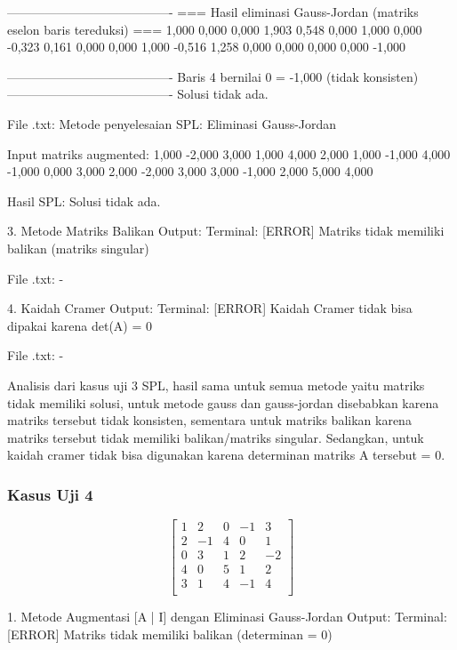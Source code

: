 \documentclass[12pt]{article}
\begin{document}
\begin{enumerate}
\begin{keluaran}
----------------------------------------
=== Hasil eliminasi Gauss-Jordan (matriks eselon baris tereduksi) ===
1,000   0,000   0,000   1,903   0,548
0,000   1,000   0,000   -0,323  0,161
0,000   0,000   1,000   -0,516  1,258
0,000   0,000   0,000   0,000   -1,000

----------------------------------------
Baris 4 bernilai 0 = -1,000 (tidak konsisten)
----------------------------------------
Solusi tidak ada.

File .txt:
Metode penyelesaian SPL: Eliminasi Gauss-Jordan

Input matriks augmented:
1,000	-2,000	3,000	1,000	4,000
2,000	1,000	-1,000	4,000	-1,000
0,000	3,000	2,000	-2,000	3,000
3,000	-1,000	2,000	5,000	4,000

Hasil SPL:
Solusi tidak ada.

3. Metode Matriks Balikan
Output:
Terminal:
[ERROR] Matriks tidak memiliki balikan (matriks singular)

File .txt:
-

4. Kaidah Cramer
Output:
Terminal:
[ERROR] Kaidah Cramer tidak bisa dipakai karena det(A) = 0

File .txt:
-
\end{keluaran}
Analisis dari kasus uji 3 SPL, hasil sama untuk semua metode yaitu matriks tidak memiliki solusi, untuk metode gauss dan gauss-jordan disebabkan karena matriks tersebut tidak konsisten, sementara untuk matriks balikan karena matriks tersebut tidak memiliki balikan/matriks singular. Sedangkan, untuk kaidah cramer tidak bisa digunakan karena determinan matriks A tersebut = 0.
\subsubsection{Kasus Uji 4}
\begin{equation}
    \begin{bmatrix}
        1 & 2 & 0 & -1 & 3 \\
        2 & -1 & 4 & 0 & 1 \\
        0 & 3 & 1 & 2 & -2 \\
        4 & 0 & 5 & 1 & 2 \\
        3 & 1 & 4 & -1 & 4 \\
    \end{bmatrix}
\end{equation}
\begin{keluaran}
1. Metode Augmentasi [A | I] dengan Eliminasi Gauss-Jordan
Output:
Terminal:
[ERROR] Matriks tidak memiliki balikan (determinan = 0)


\end{keluaran}
\end{enumerate}
\end{document}
